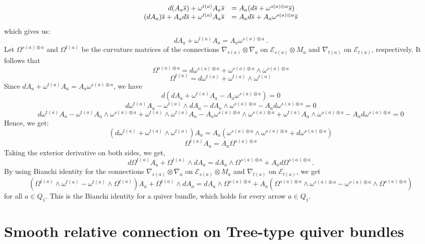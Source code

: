 \documentclass[12pt, reqno]{amsart}
\theoremstyle{plain}
\numberwithin{equation}{section}
\begin{document}
    \begin{equation*}
		\begin{array}{@{}rl@{}}
			d(A_a\overline{s})+\omega^{t(a)}A_a\overline{s} &= A_a(d\overline{s}+\omega^{s(a)\otimes a}\overline{s})\\
			(dA_a)\overline{s}+A_ad\overline{s}+ \omega^{t(a)}A_a\overline{s} &= A_ad\overline{s} + A_a \omega^{s(a)\otimes a}\overline{s}\\
			
		\end{array}
	\end{equation*}
	which gives us:
	$$dA_a + \omega^{t(a)}A_a= A_a \omega^{s(a)\otimes a}\,.$$
	Let $\Omega^{s(a)\otimes a}$ and $\Omega^{t(a)}$ be the curvature matrices of the connections $\nabla_{s(a)}\otimes \nabla_a$ on  $\mathcal{E}_{s(a)}\otimes M_a$ and $\nabla_{t(a)}$ on $\mathcal{E}_{t(a)}$, respectively. It follows that
	$$\Omega^{s(a)\otimes a}= d\omega^{s(a)\otimes a}+ \omega^{s(a)\otimes a}\wedge \omega^{s(a)\otimes a}$$
	$$\Omega^{t(a)}= d\omega^{t(a)}+ \omega^{t(a)}\wedge \omega^{t(a)}$$
	Since $dA_a + \omega^{t(a)}A_a= A_a \omega^{s(a)\otimes a}$, we have
	$$d(dA_a + \omega^{t(a)}A_a - A_a \omega^{s(a)\otimes a})=0$$
	$$d \omega^{t(a)}A_a - \omega^{t(a)} \wedge dA_a -dA_a\wedge \omega^{s(a)\otimes a}-A_ad\omega^{s(a)\otimes a} =0$$
	$$d \omega^{t(a)}A_a - \omega^{t(a)}A_a \wedge \omega^{s(a)\otimes a} + \omega^{t(a)} \wedge \omega^{t(a)}A_a- A_a \omega^{s(a)\otimes a} \wedge \omega^{s(a)\otimes a} + \omega^{t(a)}A_a\wedge \omega^{s(a)\otimes a}- A_a d\omega^{s(a)\otimes a}=0$$
	Hence, we get:
	$$(d \omega^{t(a)} + \omega^{t(a)} \wedge \omega^{t(a)})A_a= A_a(\omega^{s(a)\otimes a} \wedge \omega^{s(a)\otimes a} +  d\omega^{s(a)\otimes a})$$
	$$\Omega^{t(a)}A_a=A_a\Omega^{s(a)\otimes a}$$
	Taking the exterior derivative on both sides, we get,
	$$d\Omega^{t(a)}A_a + \Omega^{t(a)}\wedge dA_a=dA_a \wedge \Omega^{s(a)\otimes a}+A_a d\Omega^{s(a)\otimes a}\,.$$
	By using Bianchi identity for the connections $\nabla_{s(a)}\otimes \nabla_a$ on  $\mathcal{E}_{s(a)}\otimes M_a$ and $\nabla_{t(a)}$ on $\mathcal{E}_{t(a)}$, we get
	$$(\Omega^{t(a)}\wedge \omega^{t(a)}- \omega^{t(a)}\wedge \Omega^{t(a)})A_a +  \Omega^{t(a)}\wedge dA_a = dA_a \wedge \Omega^{s(a)\otimes a}+A_a (\Omega^{s(a)\otimes a}\wedge \omega^{s(a)\otimes a}- \omega^{s(a)\otimes a}\wedge \Omega^{s(a)\otimes a})$$
	for all $a\in Q_1$. This is the Bianchi identity for a quiver bundle, which holds for every arrow $a\in Q_1$.



\section{Smooth relative connection on Tree-type quiver bundles}
\end{document}
